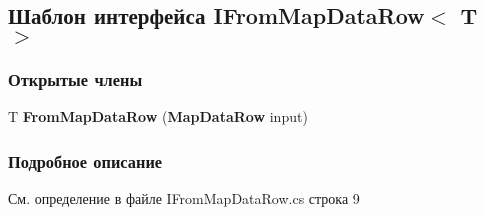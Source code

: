 \subsection{Шаблон интерфейса I\+From\+Map\+Data\+Row$<$ T $>$}
\label{interfacekdz__manager_1_1_i_from_map_data_row}
\subsubsection*{Открытые члены}
\begin{DoxyCompactItemize}
\item 
T {\bfseries From\+Map\+Data\+Row} ({\bf Map\+Data\+Row} input)\label{interfacekdz__manager_1_1_i_from_map_data_row_a6bfee7c6ccbd75bb8f757c20752b79f7}

\end{DoxyCompactItemize}


\subsubsection{Подробное описание}


См. определение в файле I\+From\+Map\+Data\+Row.\+cs строка 9

